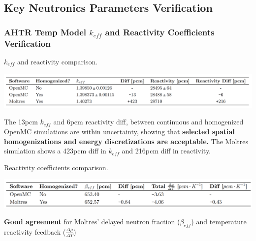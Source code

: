 \subsection*{Key Neutronics Parameters Verification}
\begin{frame}
    \frametitle{AHTR Temp Model $k_{eff}$ and Reactivity Coefficients Verification}
        \begin{table}
            \caption{$k_{eff}$ and reactivity comparison.}
            \vspace{-0.2cm}
            \includegraphics[width=0.9\linewidth]{figures/benchmark-keff.png}
        \end{table}
        The 13pcm $k_{eff}$ and 6pcm reactivity diff, between
        continuous and homogenized OpenMC simulations are within uncertainty, showing 
        that \textbf{selected spatial homogenizations and energy discretizations are 
        acceptable.}
        The Moltres simulation shows a 423pcm diff in $k_{eff}$ and 216pcm 
        diff in reactivity.
        \begin{table}
            \caption{Reactivity coefficients comparison.}
            \includegraphics[width=0.85\linewidth]{figures/benchmark-coeff.png}
        \end{table}
        \textbf{Good agreement} for Moltres' delayed neutron fraction ($\beta_{eff}$) and 
        temperature reactivity feedback ($\frac{\Delta \rho}{\Delta T}$)
\end{frame}


